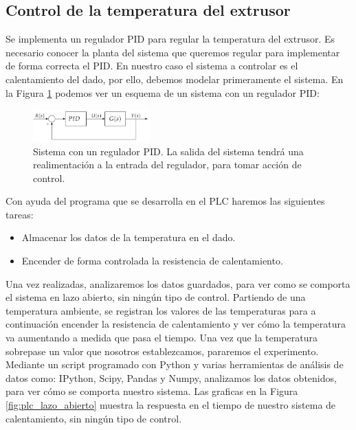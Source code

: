 \subsection{Control de la temperatura del extrusor}
\label{sec:plc_PID}

Se implementa un regulador PID para regular la temperatura del extrusor. Es necesario conocer la planta del sistema que queremos regular para implementar de forma correcta el PID. En nuestro caso el sistema a controlar es el calentamiento del dado, por ello, debemos modelar primeramente el sistema. En la Figura \ref{fig:plc_sistema} podemos ver un esquema de un sistema con un regulador PID:

\begin{figure}[H]
    \centering
    \includegraphics[width=0.4\textwidth]{images/PLC/sistema.png}
    \caption[Sistema con un regulador PID.]{Sistema con un regulador PID. La salida del sistema tendrá una realimentación a la entrada del regulador, para tomar acción de control.}
    \label{fig:plc_sistema}
\end{figure}

Con ayuda del programa que se desarrolla en el PLC haremos las siguientes tareas:

\begin{itemize}
    \item{Almacenar los datos de la temperatura en el dado.}
    \item{Encender de forma controlada la resistencia de calentamiento.}
\end{itemize}

Una vez realizadas, analizaremos los datos guardados, para ver como se comporta el sistema en lazo abierto, sin ningún tipo de control. Partiendo de una temperatura ambiente, se registran los valores de las temperaturas para a continuación encender la resistencia de calentamiento y ver cómo la temperatura va aumentando a medida que pasa el tiempo. Una vez que la temperatura sobrepase un valor que nosotros establezcamos, pararemos el experimento.\\

Mediante un script programado con Python y varias herramientas de análisis de datos como: IPython, Scipy, Pandas y Numpy, analizamos los datos obtenidos, para ver cómo se comporta nuestro sistema. Las graficas en la Figura \ref{fig:plc_lazo_abierto} muestra la respuesta en el tiempo de nuestro sistema de calentamiento, sin ningún tipo de control.

